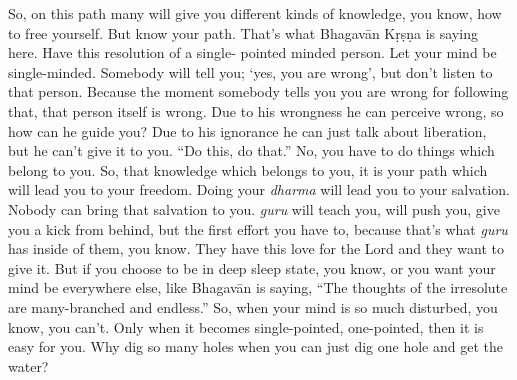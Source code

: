 So, on this path many will give you different kinds of knowledge, you know, how to free yourself. But know your path. That’s what Bhagavān Kṛṣṇa is saying here. Have this resolution of a single- pointed minded person. Let your mind be single-minded. Somebody will tell you; ‘yes, you are wrong’, but don’t listen to that person. Because the moment somebody tells you you are wrong for following that, that person itself is wrong. Due to his wrongness he can perceive wrong, so how can he guide you? Due to his ignorance he can just talk about liberation, but he can’t give it to you. “Do this, do that.” No, you have to do things which belong to you. So, that knowledge which belongs to you, it is your path which will lead you to your freedom. Doing your \textit{dharma} will lead you to your salvation. Nobody can bring that salvation to you. \textit{guru} will teach you, will push you, give you a kick from behind, but the first effort you have to, because that’s what \textit{guru} has inside of them, you know. They have this love for the Lord and they want to give it. But if you choose to be in deep sleep state, you know, or you want your mind be everywhere else, like Bhagavān is saying, “The thoughts of the irresolute are many-branched and endless.” So, when your mind is so much disturbed, you know, you can’t. Only when it becomes single-pointed, one-pointed, then it is easy for you. Why dig so many holes when you can just dig one hole and get the water?

